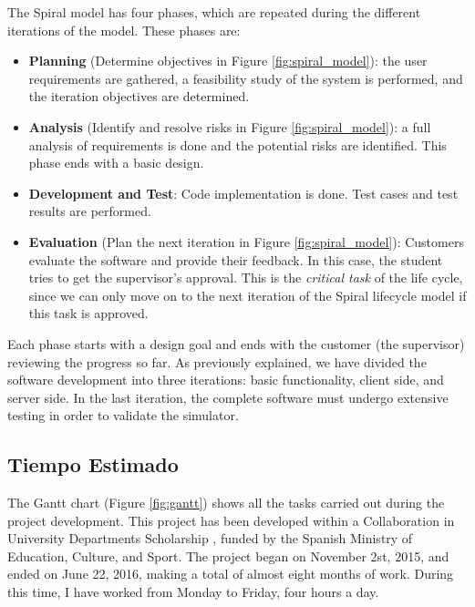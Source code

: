 The Spiral model has four phases, which are repeated during the different iterations of the model. These phases are:

\begin{itemize}

\item \textbf{Planning} (Determine objectives in Figure \ref{fig:spiral_model}): the user requirements are gathered, a feasibility study of the system is performed, and the iteration objectives are determined. 

\item \textbf{Analysis} (Identify and resolve risks in Figure \ref{fig:spiral_model}): a full analysis of requirements is done and the potential risks are identified. This phase ends with a basic design.

\item \textbf{Development and Test}: Code implementation is done. Test cases and test results are performed.

\item \textbf{Evaluation} (Plan the next iteration in Figure \ref{fig:spiral_model}): Customers evaluate the software and provide their feedback. In this case, the student tries to get the supervisor's approval. This is  the \textit{critical task} of the life cycle, since we can only move on to the next iteration of the Spiral lifecycle model if this task is approved.

\end{itemize}

Each phase starts with a design goal and ends with the customer (the supervisor) reviewing the progress so far. As previously explained, we have divided the software development into three iterations: basic functionality, client side, and server side. In the last iteration, the complete software must undergo extensive testing in order to validate the simulator.


\subsection{Tiempo Estimado}

The Gantt chart (Figure \ref{fig:gantt}) shows all the tasks carried out during the project development. This project has been developed within a Collaboration in University Departments Scholarship \cite{colaboracion}, funded by the Spanish Ministry of Education, Culture, and Sport. The project began on November 2st, 2015, and ended on June 22, 2016, making a total of almost eight months of work. During this time, I have worked from Monday to Friday, four hours a day.

